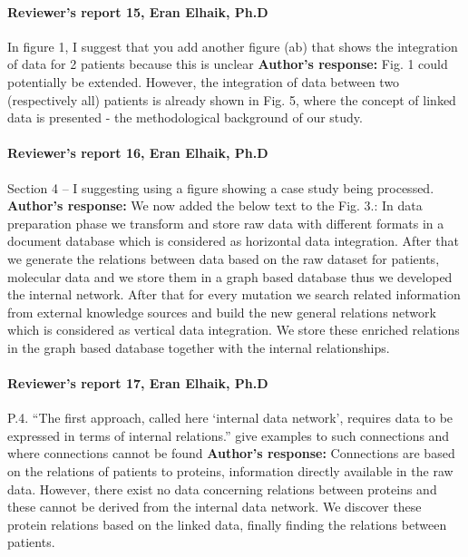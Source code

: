 \documentclass{bmcart}
\begin{document}
\paragraph {Reviewer's report 15, Eran Elhaik, Ph.D}
In figure 1, I suggest that you add another figure (ab) that shows the integration of data for 2 patients because this is unclear
\newline \textbf{Author's response:}
Fig. 1 could potentially be extended. However, the integration of data between two (respectively all) patients is already shown in Fig. 5, where the concept of linked data is presented - the methodological background of our study.


\paragraph {Reviewer's report 16, Eran Elhaik, Ph.D}
Section 4 – I suggesting using a figure showing a case study being processed.
\newline \textbf{Author's response:}
We now added the below text to the Fig. 3.:
In data preparation phase we transform and store raw data with different formats in a document database which is considered as horizontal data integration. After that we generate the relations between data based on the raw dataset for patients, molecular data and we store them in a graph based database thus we developed the internal network. After that for every mutation we search related information from external knowledge sources and build the new general relations network which is considered as vertical data integration. We store these enriched relations in the graph based database together with the internal relationships.


\paragraph {Reviewer's report 17, Eran Elhaik, Ph.D}
 P.4. “The first approach, called here `internal data network', requires data to be expressed in terms of internal relations.” give examples to such connections and where connections cannot be found
\newline \textbf{Author's response:}
Connections are based on the relations of patients to proteins, information directly available in the raw data. However, there exist no data concerning relations between proteins and these cannot be derived from the internal data network. We discover these protein relations based on the linked data, finally finding the relations between patients.
\end{document}
